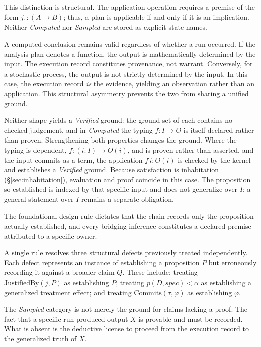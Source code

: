\documentclass[manuscript,nonacm=true]{acmart}
\begin{document}
This distinction is structural. The application operation requires a premise of the form $j_1 : (A \to B)$; thus, a plan is applicable if and only if it is an implication. Neither \emph{Computed} nor \emph{Sampled} are stored as explicit state names.

A computed conclusion remains valid regardless of whether a run occurred. If the analysis plan denotes a function, the output is mathematically determined by the input. The execution record constitutes provenance, not warrant. Conversely, for a stochastic process, the output is not strictly determined by the input. In this case, the execution record \emph{is} the evidence, yielding an observation rather than an application. This structural asymmetry prevents the two from sharing a unified ground.

Neither shape yields a \emph{Verified} ground: the ground set of each contains no checked judgement, and in \emph{Computed} the typing $f : I \to O$ is itself declared rather than proven. Strengthening both properties changes the ground. Where the typing is dependent, $f : (i : I) \to O(i)$, and is proven rather than asserted, and the input commits as a term, the application $f\,i : O(i)$ is checked by the kernel and establishes a \emph{Verified} ground. Because satisfaction is inhabitation (\S\ref{sec:inhabitation}), evaluation and proof coincide in this case. The proposition so established is indexed by that specific input and does not generalize over $I$; a general statement over $I$ remains a separate obligation.

The foundational design rule dictates that the chain records only the proposition actually established, and every bridging inference constitutes a declared premise attributed to a specific owner.

A single rule resolves three structural defects previously treated independently. Each defect represents an instance of establishing a proposition $P$ but erroneously recording it against a broader claim $Q$. These include: treating $\mathrm{JustifiedBy}(j,P)$ as establishing $P$; treating $p(D, \mathit{spec}) < \alpha$ as establishing a generalized treatment effect; and treating $\mathrm{Commits}(\tau, \varphi)$ as establishing $\varphi$.

The \emph{Sampled} category is not merely the ground for claims lacking a proof. The fact that a specific run produced output $X$ is provable and must be recorded. What is absent is the deductive license to proceed from the execution record to the generalized truth of $X$.
\end{document}
